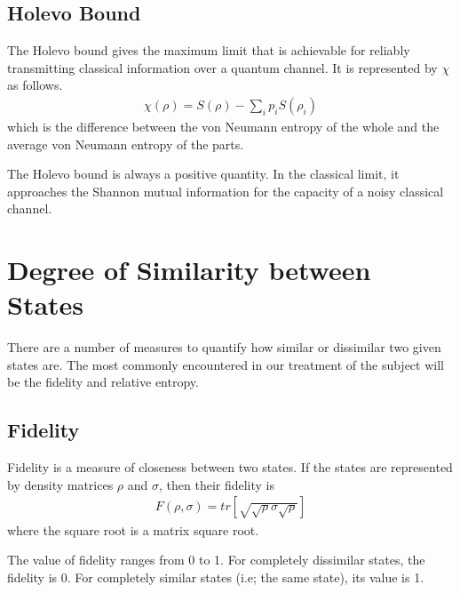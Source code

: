 \subsection{Holevo Bound}
\par The Holevo bound gives the maximum limit that is achievable for reliably transmitting classical information over a quantum channel. It is represented by $\chi$ as follows.
\begin{align*}
\chi(\rho) = S(\rho) - \sum_i p_i S(\rho_i)
\end{align*}
which is the difference between the von Neumann entropy of the whole and the average von Neumann entropy of the parts.
\par The Holevo bound is always a positive quantity. In the classical limit, it approaches the Shannon mutual information for the capacity of a noisy classical channel.

\section{Degree of Similarity between States}
\par There are a number of measures to quantify how similar or dissimilar two given states are. The most commonly encountered in our treatment of the subject will be the fidelity and relative entropy.
\subsection{Fidelity}
\par Fidelity is a measure of closeness between two states. If the states are represented by density matrices $\rho$ and $\sigma$, then their fidelity is
\begin{align*}
F(\rho,\sigma) = tr \left[ \sqrt{ \sqrt{\rho} \sigma \sqrt{\rho} } \right]
\end{align*}
where the square root is a matrix square root.
\par The value of fidelity ranges from 0 to 1. For completely dissimilar states, the fidelity is 0. For completely similar states (i.e; the same state), its value is 1.
